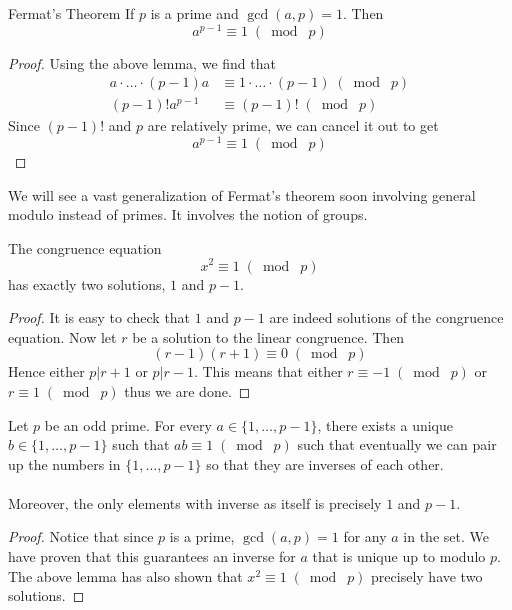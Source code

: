 \documentclass[a4paper]{article}
\begin{document}
\begin{thm}{Fermat's Theorem}{} If $p$ is a prime and $\gcd{(a,p)}=1$. Then $$a^{p-1}\equiv 1\;(\bmod\;p)$$ \tcbline
\begin{proof}
Using the above lemma, we find that 
\begin{align*}
a\cdot\dots\cdot(p-1)a&\equiv 1\cdot\dots\cdot(p-1)\;(\bmod\;p)\\
(p-1)!a^{p-1}&\equiv(p-1)!\;(\bmod\;p)
\end{align*}
Since $(p-1)!$ and $p$ are relatively prime, we can cancel it out to get $$a^{p-1}\equiv 1\;(\bmod\;p)$$
\end{proof}
\end{thm}

We will see a vast generalization of Fermat's theorem soon involving general modulo instead of primes. It involves the notion of groups. 

\begin{lmm}{}{} The congruence equation $$x^2\equiv 1\;(\bmod\;p)$$ has exactly two solutions, $1$ and $p-1$. \tcbline
\begin{proof}
It is easy to check that $1$ and $p-1$ are indeed solutions of the congruence equation. Now let $r$ be a solution to the linear congruence. Then $$(r-1)(r+1)\equiv 0\;(\bmod\;p)$$ Hence either $p|r+1$ or $p|r-1$. This means that either $r\equiv-1\;(\bmod\;p)$ or $r\equiv 1\;(\bmod\;p)$ thus we are done. 
\end{proof}
\end{lmm}

\begin{lmm}{}{} Let $p$ be an odd prime. For every $a\in\{1,\dots,p-1\}$, there exists a unique $b\in\{1,\dots,p-1\}$ such that $ab\equiv 1\;(\bmod\;p)$ such that eventually we can pair up the numbers in $\{1,\dots,p-1\}$ so that they are inverses of each other. \\~\\
Moreover, the only elements with inverse as itself is precisely $1$ and $p-1$. \tcbline
\begin{proof}
Notice that since $p$ is a prime, $\gcd(a,p)=1$ for any $a$ in the set. We have proven that this guarantees an inverse for $a$ that is unique up to modulo $p$. The above lemma has also shown that $x^2\equiv 1\;(\bmod\;p)$ precisely have two solutions. 
\end{proof}
\end{lmm}
\end{document}
